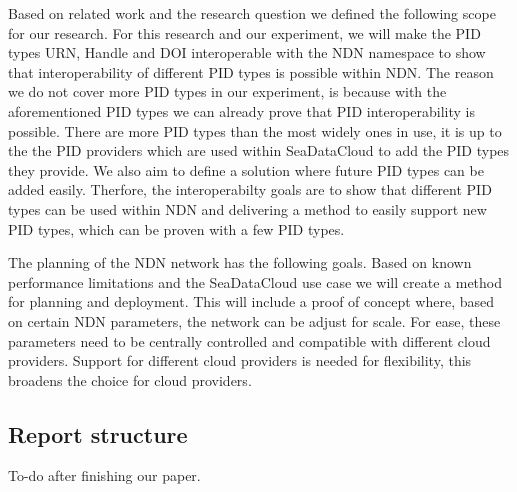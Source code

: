 
Based on related work and the research question we defined the following scope for our research. For this research and our experiment, we will make the PID types URN, Handle and DOI interoperable with the NDN namespace to show that interoperability of different PID types is possible within NDN.
The reason we do not cover more PID types in our experiment, is because with the aforementioned PID types we can already prove that PID interoperability is possible. There are more PID types than the most widely ones in use, it is up to the the PID providers which are used within SeaDataCloud to add the PID types they provide. We also aim to define a solution where future PID types can be added easily.
Therfore, the interoperabilty goals are to show that different PID types can be used within NDN and delivering a method to easily support new PID types, which can be proven with a few PID types.



The planning of the NDN network has the following goals. Based on known performance limitations and the SeaDataCloud use case we will create a method for planning and deployment. This will include a proof of concept where, based on certain NDN parameters, the network can be adjust for scale. For ease, these parameters need to be centrally controlled and compatible with different cloud providers. Support for different cloud providers is needed for flexibility, this broadens the choice for cloud providers.

\subsection{Report structure}
To-do after finishing our paper.

